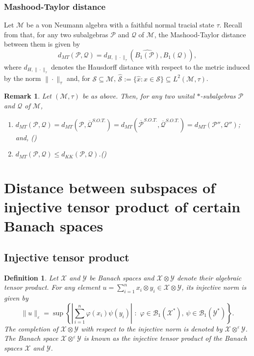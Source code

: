 \documentclass{amsart}
\numberwithin{equation}{section}
\newcommand{\mcal}{\mathcal}
\newcommand{\1}{\mathbf{1}}
\newtheorem{definition}[theorem]{Definition}
\newtheorem{remark}[theorem]{Remark}
\begin{document}
\subsubsection{Mashood-Taylor distance} 
Let $\mcal{M}$ be a von Neumann algebra with a faithful normal tracial
state $\tau$. Recall from \cite[Section 5]{GK} that, for any two subalgebras
$\mcal{P}$ and $ \mcal{Q}$ of  $\mcal{M}$, the Mashood-Taylor
distance between them  is given by
\[
d_{MT} (\mcal{P}, \mcal{Q}) = d_{H, \|\cdot\|_\tau } (\widehat{B_1(\mcal{P})}, \widehat{B_1(\mcal{Q})}),
\]
where $d_{H, \|\cdot\|_\tau}$ denotes the Hausdorff distance with
respect to the metric induced by the norm $\|\cdot\|_\tau$ and, for
$\mcal{S} \subseteq \mcal{M}$, $\widehat{\mcal{S}}:= \{ \widehat{x} :
x \in \mathcal{S}\} \subseteq L^2(\mcal{M}, \tau)$.

\begin{remark}\label{SOT}
Let $(\mathcal{M},\tau)$ be as above. Then, for any two unital $*$-subalgebras $\mcal{P}$ and $ \mcal{Q}$ of $\mcal{M}$, 
\begin{enumerate}
\item $
d_{MT}(\mcal{P},\mcal{Q} ) = d_{MT}(\mcal{P}, \overline{\mcal{Q}}^{S.O.T.}) =
d_{MT}(\overline{\mcal{P}}^{S.O.T.}, \overline{\mcal{Q}}^{S.O.T.}) = d_{MT}(\mcal{P}'',
\mcal{Q}'')$; and, \hfill (\cite[Proposition 5.5]{GK})

\item $ 
d_{MT}(\mcal{P},\mcal{Q} )\leq d_{KK}(\mcal{P},\mcal{Q} ) $.\hfill  (\cite[Lemma 5.6]{GK})
\end{enumerate}
\end{remark}

\section{Distance between subspaces of injective tensor product of certain Banach spaces}\label{injective}
\subsection{Injective tensor product}
\begin{definition}
Let $\mcal{X}$ and $\mcal{Y}$ be Banach spaces and $\mcal{X}\otimes \mcal{Y}$ denote their algebraic tensor product. For any element $u= \sum_{i=1}^n x_i\otimes y_i \in \mcal{X}\otimes \mcal{Y}$, its injective norm is given by 
$$
\|u\|_{\varepsilon} = \sup \left\{\left|
  \sum_{i=1}^{n}\varphi(x_{i})\psi(y_{i})\right|\,\, :\,\,
 \varphi\in \mcal{B}_{1}(\mcal{X}^*),\, \psi\in \mcal{B}_{1}(\mcal{Y}^*)
  \right\}.
$$
The completion of $\mcal{X}\otimes \mcal{Y}$ with respect to the injective norm is denoted by $\mcal{X} \otimes^{\varepsilon} \mcal{Y}$. The Banach space $\mcal{X} \otimes^{\varepsilon} \mcal{Y}$ is known as the injective tensor product of the Banach spaces $\mcal{X}$ and $ \mcal{Y}$. 
\end{definition}
\end{document}
